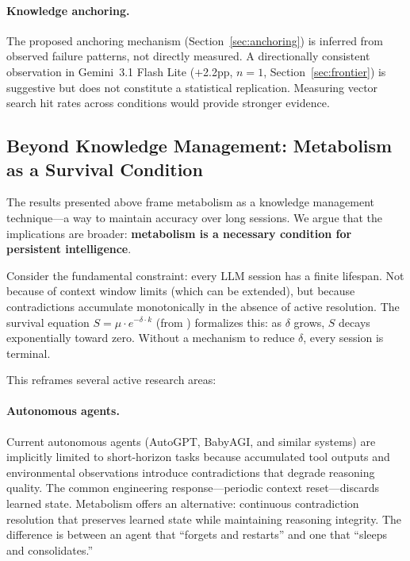\documentclass[11pt,a4paper]{article}
\begin{document}
\paragraph{Knowledge anchoring.}
The proposed anchoring mechanism (Section~\ref{sec:anchoring}) is inferred from observed failure patterns, not directly measured.
A directionally consistent observation in Gemini~3.1 Flash Lite ($+$2.2pp, $n = 1$, Section~\ref{sec:frontier}) is suggestive but does not constitute a statistical replication. Measuring vector search hit rates across conditions would provide stronger evidence.

\subsection{Beyond Knowledge Management: Metabolism as a Survival Condition}
\label{sec:survival-condition}

The results presented above frame metabolism as a knowledge management technique---a way to maintain accuracy over long sessions. We argue that the implications are broader: \textbf{metabolism is a necessary condition for persistent intelligence}.

Consider the fundamental constraint: every LLM session has a finite lifespan. Not because of context window limits (which can be extended), but because contradictions accumulate monotonically in the absence of active resolution. The survival equation $S = \mu \cdot e^{-\delta \cdot k}$ (from \citet{sunagawa2026collapse}) formalizes this: as $\delta$ grows, $S$ decays exponentially toward zero. Without a mechanism to reduce $\delta$, every session is terminal.

This reframes several active research areas:

\paragraph{Autonomous agents.}
Current autonomous agents (AutoGPT, BabyAGI, and similar systems) are implicitly limited to short-horizon tasks because accumulated tool outputs and environmental observations introduce contradictions that degrade reasoning quality. The common engineering response---periodic context reset---discards learned state. Metabolism offers an alternative: continuous contradiction resolution that preserves learned state while maintaining reasoning integrity. The difference is between an agent that ``forgets and restarts'' and one that ``sleeps and consolidates.''
\end{document}
